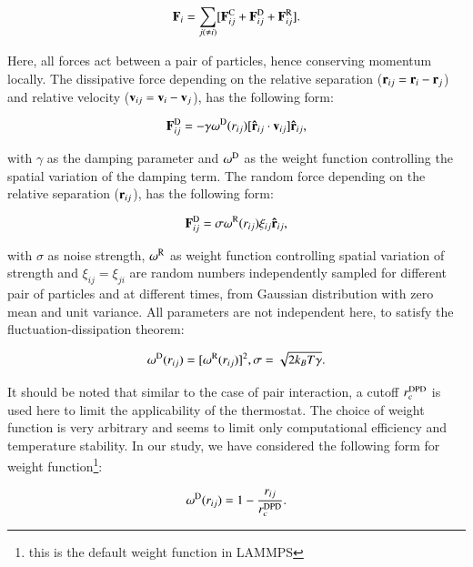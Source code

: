     \begin{equation}
        {\bf F}_i = \sum_{j(\neq i)} [ {\bf F}^{\rm C}_{ij} + {\bf F}^{\rm D}_{ij} + {\bf F}^{\rm R}_{ij}  ].
    \end{equation}
    
    Here, all forces act between a pair of particles, hence conserving momentum locally. The dissipative force depending on the relative separation (${\bf r}_{ij} = {\bf r}_i - {\bf r}_j$) and relative velocity (${\bf v}_{ij} = {\bf v}_i - {\bf v}_j$), has the following form:
    
    \begin{equation}
        {\bf F}^{\rm D}_{ij} = -\gamma \omega^{\rm D}(r_{ij}) [{\bf \hat{r}} _{ij}\cdot{\bf v}_{ij}] {\bf \hat{r}} _{ij},
    \end{equation}
    
    with $\gamma$ as the damping parameter and $\omega^{\rm D}$ as the weight function controlling the spatial variation of the damping term. The random force depending on the relative separation (${\bf r}_{ij}$), has the following form:
    
    \begin{equation}
    {\bf F}^{\rm D}_{ij} = \sigma \omega^{\rm R}(r_{ij}) \xi_{ij} {\bf \hat{r}} _{ij},
    \end{equation}
    
    with $\sigma$ as noise strength, $\omega^{\rm R}$ as weight function controlling spatial variation of strength and $\xi_{ij} = \xi_{ji}$ are random numbers independently sampled for different pair of particles and at different times, from Gaussian distribution with zero mean and unit variance. All parameters are not independent here, to satisfy the fluctuation-dissipation theorem:
    
    \begin{equation}
        \omega^{\rm D}(r_{ij}) = [\omega^{\rm R}(r_{ij})]^2,
        \sigma = \sqrt{2k_BT\gamma}.
    \end{equation}

    It should be noted that similar to the case of pair interaction, a cutoff $r_c^{\rm DPD}$ is used here to limit the applicability of the thermostat. The choice of weight function is very arbitrary and seems to limit only computational efficiency and temperature stability. In our study, we have considered the following form for weight function\footnote{this is the default weight function in LAMMPS}:
    
    \begin{equation}
        \omega^{\rm D}(r_{ij}) = 1 - \frac{r_{ij}}{r_c^{\rm DPD}}.
    \end{equation}
    
